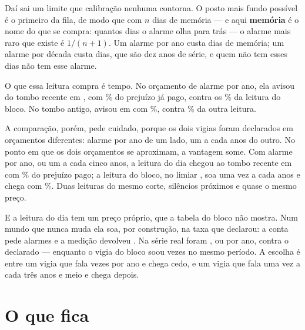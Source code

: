 Daí sai um limite que calibração nenhuma contorna. O posto mais fundo possível é o primeiro da
fila, de modo que com $n$ dias de memória --- e aqui \textbf{memória} é o nome do que se compra:
quantos dias o alarme olha para trás --- o alarme mais raro que existe é $1/(n+1)$.
Um alarme
por ano custa \numMemoriaUmAlarmePorAnoDias{} dias de memória; um alarme por década custa
\numMemoriaUmAlarmePorDecadaDias{} dias, que são dez anos de série, e quem não tem esses dias
não tem esse alarme.

O que essa leitura compra é tempo. No orçamento de \numFundoUmAnoAlarmesPorAno{} alarme por
ano, ela avisou do tombo recente em \numSegundaLeituraTomboRecenteData, com
\numSegundaLeituraTomboRecentePagoPct\% do prejuízo já pago, contra os
\numVigiaTomboRecentePagoPct\% da leitura do bloco. No tombo antigo, avisou em
\numSegundaLeituraTomboAntigoData{} com \numSegundaLeituraTomboAntigoPagoPct\%, contra
\numVigiaTomboAntigoPagoPct\% da outra leitura.

A comparação, porém, pede cuidado, porque os dois vigias foram declarados em orçamentos
diferentes: \numFundoUmAnoAlarmesPorAno{} alarme por ano de um lado, um a cada
\numVigiaAnosParadoPorAlarme{} anos do outro. No ponto em que os dois orçamentos se aproximam,
a vantagem some. Com \numFundoCincoAnosAlarmesPorAno{} alarme por ano, ou um a cada cinco
anos, a leitura do dia chegou ao tombo recente em \numSegundaLeituraCincoAnosTomboRecenteData{}
com \numSegundaLeituraCincoAnosTomboRecentePagoPct\% do prejuízo pago; a leitura do bloco, no
limiar \numTrocaOitoLimiar, soa uma vez a cada \numTrocaOitoAnos{} anos e chega com
\numTrocaOitoPagoPct\%. Duas leituras do mesmo corte, silêncios próximos e quase o mesmo preço.

E a leitura do dia tem um preço próprio, que a tabela do bloco não mostra. Num mundo que nunca
muda ela soa, por construção, na taxa que declarou: a conta pede
\numSegundaLeituraParadoDeclarado{} alarmes e a medição devolveu \numSegundaLeituraParadoAlarmes{}.
Na série real foram \numSegundaLeituraAlarmesReais{}, ou \numSegundaLeituraAlarmesAno{} por ano,
contra o \numFundoUmAnoAlarmesPorAno{} declarado --- enquanto o vigia do bloco soou
\numVigiaAlarmesReais{} vezes no mesmo período. A escolha é entre um vigia que fala \numSegundaLeituraAlarmesAno{}
vezes por ano e chega cedo, e um vigia que fala uma vez a cada três anos e meio e chega depois.

\section{O que fica}


